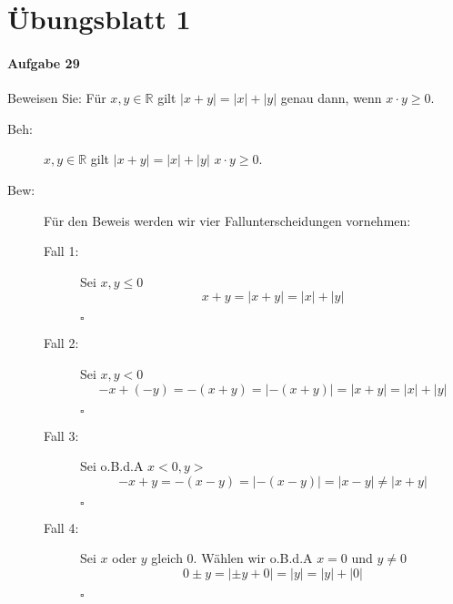 \documentclass[12pt,a4paper,leqno]{article}
\author{Rüdiger Brecht}
\begin{document}
\part*{Übungsblatt 1}
\subsection*{Aufgabe 29}
Beweisen Sie: Für $x,y \in \mathbb{R}$ gilt $|x+y|=|x| + |y|$ genau dann, wenn $x \cdot y \geq 0$.
\begin{description}
\item[Beh:]\forall $x,y \in \mathbb{R}$ gilt $|x+y|=|x| + |y|$ \Leftrightarrow $x \cdot y \geq 0$.
\item[Bew:] Für den Beweis werden wir vier Fallunterscheidungen vornehmen:
	\begin{description}
		\item[Fall 1:] Sei $x,y \leq 0$
						$$x + y = |x + y| = |x| + |y|$$ 
						\begin{flushright}$ \square $ \end{flushright}
						
		\item[Fall 2:] Sei $x,y < 0$
						$$-x + (-y) = -(x+y) = |-(x+y)| = |x + y| = |x| + |y|$$		
						\begin{flushright}$ \square $ \end{flushright}
		\item[Fall 3:] Sei o.B.d.A $x<0 , y>$
		        $$-x + y = -(x-y) = |-(x-y)| = |x-y| \neq |x+y| $$
		        \begin{flushright}$ \square $ \end{flushright}
		 \item[Fall 4:] Sei $x$ oder $y$ gleich $0$. Wählen wir o.B.d.A $x = 0$ und $y \neq 0$
		 		 $$0 \pm y = |\pm y + 0|= |y| = |y| + |0|$$
		 		 \begin{flushright}$ \square $ \end{flushright}       					
	\end{description}
\end{description} 
\end{document}
